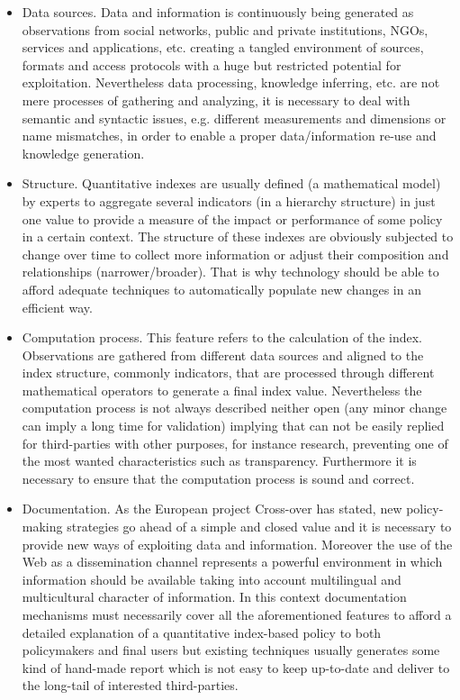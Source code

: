 \begin{itemize}
 \item Data sources. Data and information is continuously being generated as observations from social networks, public and private institutions, NGOs, services and applications, etc. 
 creating a tangled environment of sources, formats and access protocols with a huge but restricted potential for exploitation. Nevertheless data processing, knowledge inferring, etc. are not mere processes 
 of gathering and analyzing, it is necessary to deal with semantic and syntactic issues, e.g. different measurements and dimensions or name mismatches, 
 in order to enable a proper data/information re-use and knowledge generation.
 
 \item Structure. Quantitative indexes are usually defined (a mathematical model) by experts to aggregate several indicators (in a hierarchy structure) in just one value to provide
 a measure of the impact or performance of some policy in a certain context. The structure of these indexes are obviously subjected to change over time 
 to collect more information or adjust their composition and relationships (narrower/broader). That is why technology should be able to afford 
 adequate techniques to automatically populate new changes in an efficient way.
 
  \item Computation process. This feature refers to the calculation of the index. Observations are gathered from different data sources and aligned 
  to the index structure, commonly indicators, that are processed through different mathematical operators to generate a final index value. 
  Nevertheless the computation process is not always described neither open (any minor change can imply a long time for validation) implying that 
  can not be easily replied for third-parties with other purposes, for instance research, preventing one 
  of the most wanted characteristics such as transparency. Furthermore it is necessary to ensure that the computation process 
  is sound and correct.

  \item Documentation. As the European project Cross-over has stated, new policy-making strategies go ahead of a simple and closed value and it is necessary to provide 
  new ways of exploiting data and information. Moreover the use of the Web as a dissemination channel represents a powerful environment in which 
  information should be available taking into account multilingual and multicultural character of information. In this context documentation mechanisms 
  must necessarily cover all the aforementioned features to afford a detailed explanation of a quantitative index-based policy to both policymakers 
  and final users but existing techniques usually generates some kind of hand-made report which is not easy to keep up-to-date and deliver 
  to the long-tail of interested third-parties.
\end{itemize}

